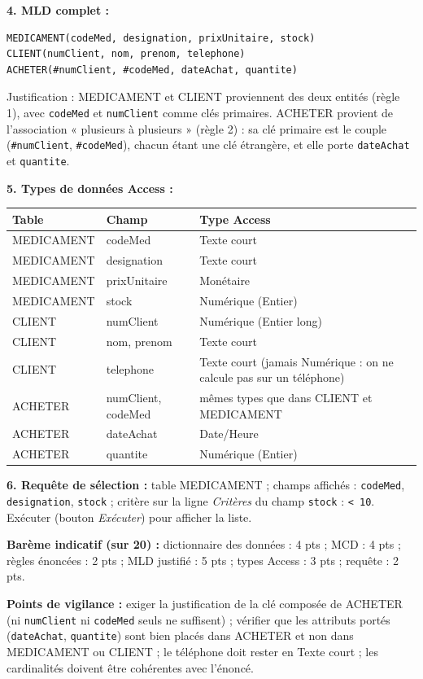 \documentclass[11pt]{article}
\begin{document}
\begin{corrige}
\textbf{4. MLD complet :}
\begin{lstlisting}
MEDICAMENT(codeMed, designation, prixUnitaire, stock)
CLIENT(numClient, nom, prenom, telephone)
ACHETER(#numClient, #codeMed, dateAchat, quantite)
\end{lstlisting}
Justification : MEDICAMENT et CLIENT proviennent des deux entités (règle 1), avec \texttt{codeMed} et \texttt{numClient} comme clés primaires. ACHETER provient de l'association « plusieurs à plusieurs » (règle 2) : sa clé primaire est le couple (\texttt{\#numClient}, \texttt{\#codeMed}), chacun étant une clé étrangère, et elle porte \texttt{dateAchat} et \texttt{quantite}.

\textbf{5. Types de données Access :}
\begin{center}
\begin{tabularx}{\linewidth}{|l|l|X|}\hline
\rowcolor{popblueL}\textbf{Table} & \textbf{Champ} & \textbf{Type Access} \\\hline
MEDICAMENT & codeMed & Texte court \\\hline
MEDICAMENT & designation & Texte court \\\hline
MEDICAMENT & prixUnitaire & Monétaire \\\hline
MEDICAMENT & stock & Numérique (Entier) \\\hline
CLIENT & numClient & Numérique (Entier long) \\\hline
CLIENT & nom, prenom & Texte court \\\hline
CLIENT & telephone & Texte court (jamais Numérique : on ne calcule pas sur un téléphone) \\\hline
ACHETER & numClient, codeMed & mêmes types que dans CLIENT et MEDICAMENT \\\hline
ACHETER & dateAchat & Date/Heure \\\hline
ACHETER & quantite & Numérique (Entier) \\\hline
\end{tabularx}
\end{center}

\textbf{6. Requête de sélection :} table MEDICAMENT ; champs affichés : \texttt{codeMed}, \texttt{designation}, \texttt{stock} ; critère sur la ligne \emph{Critères} du champ \texttt{stock} : \texttt{< 10}. Exécuter (bouton \emph{Exécuter}) pour afficher la liste.

\textbf{Barème indicatif (sur 20) :} dictionnaire des données : 4 pts ; MCD : 4 pts ; règles énoncées : 2 pts ; MLD justifié : 5 pts ; types Access : 3 pts ; requête : 2 pts.

\textbf{Points de vigilance :} exiger la justification de la clé composée de ACHETER (ni \texttt{numClient} ni \texttt{codeMed} seuls ne suffisent) ; vérifier que les attributs portés (\texttt{dateAchat}, \texttt{quantite}) sont bien placés dans ACHETER et non dans MEDICAMENT ou CLIENT ; le téléphone doit rester en Texte court ; les cardinalités doivent être cohérentes avec l'énoncé.
\end{corrige}
\end{document}
